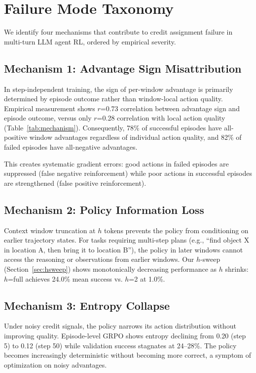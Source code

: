 \documentclass{article}
\begin{document}
\section{Failure Mode Taxonomy}

We identify four mechanisms that contribute to credit assignment failure in multi-turn LLM agent RL, ordered by empirical severity.

\subsection{Mechanism 1: Advantage Sign Misattribution}

In step-independent training, the sign of per-window advantage is primarily determined by episode outcome rather than window-local action quality. Empirical measurement shows $r$=0.73 correlation between advantage sign and episode outcome, versus only $r$=0.28 correlation with local action quality (Table~\ref{tab:mechanism}). Consequently, 78\% of successful episodes have all-positive window advantages regardless of individual action quality, and 82\% of failed episodes have all-negative advantages.

This creates systematic gradient errors: good actions in failed episodes are suppressed (false negative reinforcement) while poor actions in successful episodes are strengthened (false positive reinforcement).

\subsection{Mechanism 2: Policy Information Loss}

Context window truncation at $h$ tokens prevents the policy from conditioning on earlier trajectory states. For tasks requiring multi-step plans (e.g., ``find object X in location A, then bring it to location B''), the policy in later windows cannot access the reasoning or observations from earlier windows. Our $h$-sweep (Section~\ref{sec:hsweep}) shows monotonically decreasing performance as $h$ shrinks: $h$=full achieves 24.0\% mean success vs. $h$=2 at 1.0\%.

\subsection{Mechanism 3: Entropy Collapse}

Under noisy credit signals, the policy narrows its action distribution without improving quality. Episode-level GRPO shows entropy declining from 0.20 (step 5) to 0.12 (step 50) while validation success stagnates at 24--28\%. The policy becomes increasingly deterministic without becoming more correct, a symptom of optimization on noisy advantages.
\end{document}
